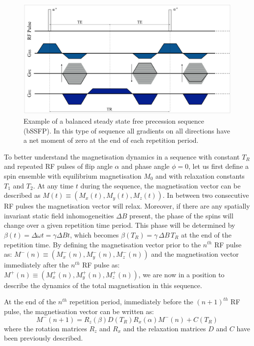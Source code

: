 \begin{figure}[ht]
    \centering
    \includegraphics[width=1\textwidth,keepaspectratio]{images/mri/bssfp2}
    \caption{Example of a balanced steady state free precession sequence (bSSFP). 
    In this type of sequence all gradients on all directions have a net moment of zero at the end of each repetition period.}
    \label{fig:bssfp}
\end{figure}

To better understand the magnetisation dynamics in a sequence with constant $T_R$ and repeated RF pulses of flip angle $\alpha$ and phase angle $\phi = 0$, let us first define a spin ensemble with equilibrium magnetisation $M_0$ and with relaxation constants $T_1$ and $T_2$.
At any time $t$ during the sequence, the magnetisation vector can be described as $M(t) \equiv (M_x(t), M_y(t), M_z(t))$.
In between two consecutive RF pulses the magnetisation vector will relax.
Moreover, if there are any spatially invariant static field inhomogeneities $\Delta B$ present,
the phase of the spins will change over a given repetition time period.
This phase will be determined by $\beta(t) = \Delta \omega t = \gamma \Delta B t$, which becomes $\beta(T_R) = \gamma \, \Delta B \, T_R$ at the end of the repetition time.
By defining the magnetisation vector prior to the $n^{th}$ RF pulse as: $M^-(n) \equiv (M_x^-(n), M_y^-(n), M_z^-(n))$ and the magnetisation vector immediately after the $n^{th}$ RF pulse as: $M^+(n) \equiv (M_x^+(n), M_y^+(n), M_z^+(n))$, we are now in a position to describe the dynamics of the total magnetisation in this sequence.

\hfill

At the end of the $n^{th}$ repetition period, immediately before the $(n+1)^{th}$ RF pulse, the magnetisation vector can be written as:
\begin{equation}\label{eq:ssfp}
    M^-(n+1) = R_z(\beta) D(T_R) R_x(\alpha) M^-(n) + C(T_R)
\end{equation}
where the rotation matrices $R_z$ and $R_x$ and the relaxation matrices $D$ and $C$ have been previously described.

